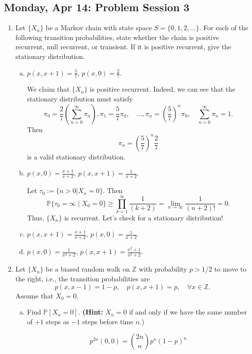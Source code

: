 \documentclass[10pt, oneside]{article}
\newcommand{\bbP}{\mathbb{P}}
\theoremstyle{definition}
\begin{document}
\subsection{Monday, Apr 14: Problem Session 3}
\begin{enumerate}
\item
Let \(\{X_n\}\) be a Markov chain with state space \(S=\{0,1,2,\ldots\}\). For each of the following transition probabilities, state whether the chain is positive recurrent, null recurrent, or transient. If it is positive recurrent, give the stationary distribution.

\begin{enumerate}[(a)]
    \item \(p(x,x+1)=\frac{5}{7}\), \(p(x,0)=\frac{2}{7}\).
\begin{solution}
    We claim that $\{X_n\}$ is positive recurrent. Indeed, we can see that the stationary distribution must satisfy
    \[\pi_0 = \frac{2}{7}(\sum_{n=0}^\infty \pi_n), \pi_1 = \frac{5}{7}\pi_0, \quad \dots, \pi_n = (\frac{5}{7})^n \pi_0, \quad \sum_{n=0}^\infty \pi_n = 1.\]
    Then 
    \[\pi_n = \left(\frac{5}{7}\right)^n \frac{2}{7}\] is a valid stationary distribution.

\end{solution}
    
    \item \(p(x,0)=\frac{x+1}{x+2}\), \(p(x,x+1)=\frac{1}{x+2}\).
\begin{solution}
    Let $\tau_0 := \{n >0 | X_n = 0 \}.$ Then 
    \[\bbP\{\tau_0  = \infty \mid X_0 = 0\} \geq \prod_{k=1}^\infty \frac{1}{(k+2)} = \lim_{n\to \infty}\frac{1}{(n+2)!} = 0.\] Thus, $\{X_n\}$ is recurrent. Let's check for a stationary distribution!
    
\end{solution}
    \item \(p(x,x+1)=\frac{x+1}{x+2}\), \(p(x,0)=\frac{1}{x+2}\).
    
    \item \(p(x,0)=\frac{1}{x^2+2}\), \(p(x,x+1)=\frac{x^2+1}{x^2+2}\).
\end{enumerate}

\item
Let \(\{X_n\}\) be a biased random walk on \(\mathbb{Z}\) with probability \(p>1/2\) to move to the right, i.e., the transition probabilities are
\[
p(x,x-1)=1-p, \quad p(x,x+1)=p, \quad \forall x\in\mathbb{Z}.
\]
Assume that \(X_0=0\).

\begin{enumerate}[(a)]
    \item Find \(\mathbb{P}[X_n=0]\). \textbf{(Hint:} \(X_n=0\) if and only if we have the same number of \(+1\) steps as \(-1\) steps before time \(n\).)
\begin{solution}
    \[p^{2n}(0,0) = \binom{2n}{n}p^n (1-p)^n\]
\end{solution}
    

\end{enumerate}
\end{enumerate}
\end{document}
